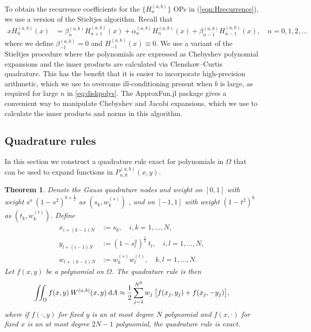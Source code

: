 \documentclass[11pt, oneside]{article}   	%
\newcommand{\half}{\frac{1}{2}}
\newcommand{\Wab}{{W^{(a,b)}}}
\newtheorem{theorem}{Theorem}
\begin{document}
To obtain the recurrence coefficients for the $\{H_n^{(a,b)}\}$ OPs in (\ref{eqn:Hrecurrence}), we use a version of the Stieltjes algorithm. Recall that
\begin{align}
x H_n^{(a,b)}(x) &= \beta_n^{(a,b)} H_{n+1}^{(a,b)}(x) + \alpha_n^{(a,b)} H_n^{(a,b)}(x) + \beta_{n-1}^{(a,b)} H_{n-1}^{(a,b)}(x), \quad n = 0,1,2,\dots
\end{align}
where we define $\beta_{-1}^{(a,b)} = 0$ and $H_{-1}^{(a,b)}(x) \equiv 0$. We use a variant of the Stieltjes procedure \cite{gautschi1982generating} where the polynomials are expressed as Chebyshev polynomial expansions and the inner products are calculated via Clenshaw--Curtis quadrature. This has the benefit that it is easier to incorporate high-precision arithmetic, which we use to overcome ill-conditioning present when $b$ is large, as required for large $n$ in \eqref{eq:diskpolys}. The ApproxFun.jl \cite{ApproxFun} package gives a convenient way to manipulate Chebyshev and Jacobi expansions, which we use to calculate the inner products and norms in this algorithm.


\subsection{Quadrature rules}

In this section we construct a quadrature rule exact for polynomials in $\Omega$ that can be used to expand functions in $P_{n,k}^{(a,b)}(x,y)$. 

\begin{theorem}

Denote the  Gauss quadrature nodes and weight on \([0,1]\) with weight \(s^a \: (1-s^2)^{b+\half}\) as $(s_k,w_k^{(s)})$ , and
 on \([-1,1]\) with weight \((1-t^2)^b\) as $(t_k,w_k^{(t)})$. Define
\begin{align}
x_{i+(k-1)N} &:= s_k, \quad i,k = 1,\dots,N, \\
y_{l+(i-1)N} &:= (1-s_l^2)^\half \: t_l, \quad i,l = 1,\dots,N, \\
w_{l+(k-1)N} &:= w_k^{(s)} w_l^{(t)}, \quad k,l = 1,\dots,N.
\end{align}
Let $f(x,y)$ be a polynomial on $\Omega$. The quadrature rule is then
$$
\iint_\Omega f(x,y) \: \Wab(x,y) \: \D A \approx \half \sum_{j=1}^{N^2} w_j \: \big[ f(x_j, y_j) + f(x_j, -y_j) \big],
$$
where if $f(\cdot, y)$ for fixed $y$ is an at most degree $N$ polynomial and $f(x, \cdot)$ for fixed $x$  is an at most degree $2N-1$ polynomial, the quadrature rule is exact.
\end{theorem}
\end{document}
